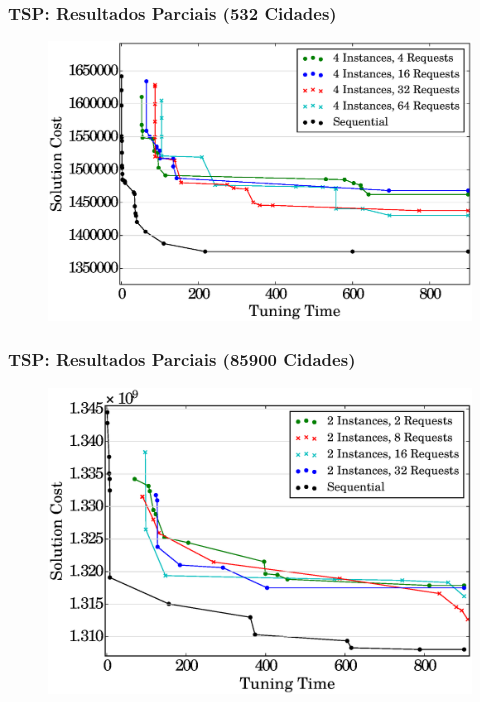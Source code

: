 \documentclass[10pt, compress]{beamer}
\begin{document}
\begin{frame}[fragile]
  \frametitle{TSP: Resultados Parciais (532 Cidades)}
  \begin{figure}[H]
      \centering
      \includegraphics[width=.9\textwidth]{i4_p_n_comparison}
  \end{figure}
\end{frame}

\begin{frame}[fragile]
 \frametitle{TSP: Resultados Parciais (85900 Cidades)}
  \begin{figure}[H]
      \centering
      \includegraphics[width=.9\textwidth]{i2_p_n_comparison_85900}
  \end{figure}
\end{frame}
\end{document}
